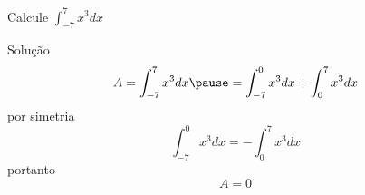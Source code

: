 \begin{question}
  Calcule \(\int_{-7}^7 x^3 dx\)
\end{question}

\begin{resolution}{Solução}
  \[
    A
    = \int_{-7}^7 x^3 dx
    \pause
    = \int_{-7}^0 x^3 dx + \int_0^7 x^3 dx
  \]
  \pause
  por simetria
  \[
    \int_{-7}^0 x^3 dx = - \int_0^7 x^3 dx
  \]
  \pause
  portanto
  \[
    A = 0
  \]
\end{resolution}

